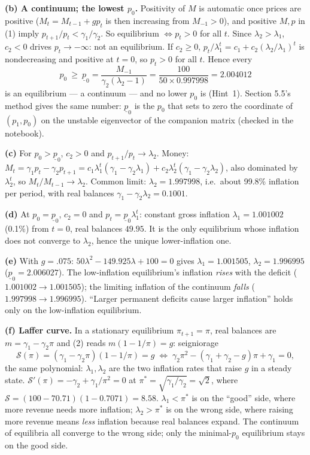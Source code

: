 \documentclass[12pt, letterpaper]{article}
\begin{document}
\begin{tcolorbox}[oddbox,title={Exercise 5.7 \quad Dynamic Laffer curves}]
\textbf{(b) A continuum; the lowest $p_0$.} Positivity of $M$ is automatic once prices are positive
($M_t=M_{t-1}+gp_t$ is then increasing from $M_{-1}>0$), and positive $M,p$ in (1) imply
$p_{t+1}/p_t<\gamma_1/\gamma_2$. So equilibrium $\iff p_t>0$ for all $t$. Since $\lambda_2>\lambda_1$,
$c_2<0$ drives $p_t\to-\infty$: not an equilibrium. If $c_2\ge0$, $p_t/\lambda_1^t=c_1+c_2(\lambda_2/\lambda_1)^t$
is nondecreasing and positive at $t=0$, so $p_t>0$ for all $t$. Hence every
\[
p_0\ \ge\ \underline p_0=\frac{M_{-1}}{\gamma_2(\lambda_2-1)}=\frac{100}{50\times0.997998}=\boxed{2.004012}
\]
is an equilibrium --- a continuum --- and no lower $p_0$ is (Hint~1). Section 5.5's method gives the
same number: $\underline p_0$ is the $p_0$ that sets to zero the coordinate of $(p_1,p_0)$ on the
unstable eigenvector of the companion matrix (checked in the notebook).

\textbf{(c)} For $p_0>\underline p_0$, $c_2>0$ and $p_{t+1}/p_t\to\lambda_2$. Money:
$M_t=\gamma_1p_t-\gamma_2p_{t+1}=c_1\lambda_1^t(\gamma_1-\gamma_2\lambda_1)+c_2\lambda_2^t(\gamma_1-\gamma_2\lambda_2)$,
also dominated by $\lambda_2^t$, so $M_t/M_{t-1}\to\lambda_2$. Common limit:
$\boxed{\lambda_2=1.997998}$, i.e.\ about 99.8\% inflation per period, with real balances
$\gamma_1-\gamma_2\lambda_2=0.1001$.

\textbf{(d)} At $p_0=\underline p_0$, $c_2=0$ and $p_t=\underline p_0\lambda_1^t$: constant gross inflation
$\boxed{\lambda_1=1.001002}$ (0.1\%) from $t=0$, real balances $49.95$. It is the only equilibrium whose
inflation does not converge to $\lambda_2$, hence the unique lower-inflation one.

\textbf{(e)} With $g=.075$: $50\lambda^2-149.925\lambda+100=0$ gives $\lambda_1=1.001505$,
$\lambda_2=1.996995$ ($\underline p_0=2.006027$). The low-inflation equilibrium's inflation
\emph{rises} with the deficit ($1.001002\to1.001505$); the limiting inflation of the continuum
\emph{falls} ($1.997998\to1.996995$). ``Larger permanent deficits cause larger inflation'' holds only
on the low-inflation equilibrium.

\textbf{(f) Laffer curve.} In a stationary equilibrium $\pi_{t+1}=\pi$, real balances are
$m=\gamma_1-\gamma_2\pi$ and (2) reads $m(1-1/\pi)=g$: seigniorage
\[
\mathcal S(\pi)=(\gamma_1-\gamma_2\pi)(1-1/\pi)=g
\;\iff\;\gamma_2\pi^2-(\gamma_1+\gamma_2-g)\pi+\gamma_1=0,
\]
the same polynomial: $\lambda_1,\lambda_2$ are the two inflation rates that raise $g$ in a steady
state. $\mathcal S'(\pi)=-\gamma_2+\gamma_1/\pi^2=0$ at $\pi^*=\sqrt{\gamma_1/\gamma_2}=\sqrt2$, where
$\mathcal S=(100-70.71)(1-0.7071)=8.58$. $\lambda_1<\pi^*$ is on the ``good'' side, where
more revenue needs more inflation; $\lambda_2>\pi^*$ is on the wrong side, where raising more revenue
means \emph{less} inflation because real balances expand. The continuum of equilibria all converge to
the wrong side; only the minimal-$p_0$ equilibrium stays on the good side.


\end{tcolorbox}
\end{document}
